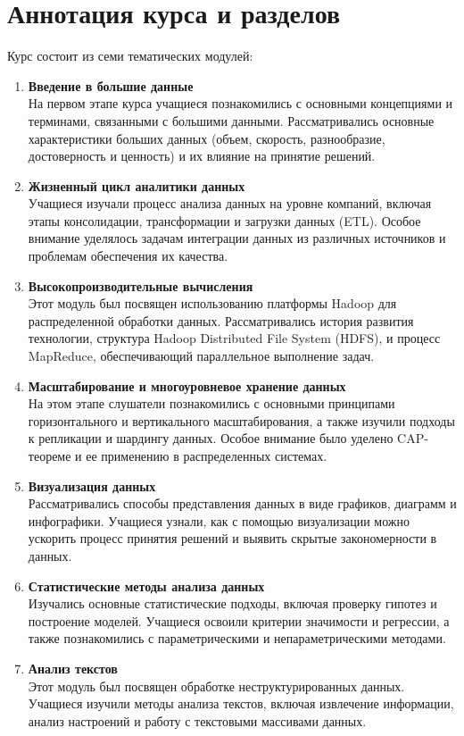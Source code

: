 \documentclass[a4paper, final]{article}
\begin{document}
\newpage
\section{Аннотация курса и разделов}
Курс состоит из семи тематических модулей:
\begin{enumerate}
  \item \textbf{Введение в большие данные} \\
На первом этапе курса учащиеся познакомились с основными концепциями и терминами, связанными с большими данными. Рассматривались основные характеристики больших данных (объем, скорость, разнообразие, достоверность и ценность) и их влияние на принятие решений.

  \item \textbf{Жизненный цикл аналитики данных} \\
Учащиеся изучали процесс анализа данных на уровне компаний, включая этапы консолидации, трансформации и загрузки данных (ETL). Особое внимание уделялось задачам интеграции данных из различных источников и проблемам обеспечения их качества.

  \item \textbf{Высокопроизводительные вычисления}\\
Этот модуль был посвящен использованию платформы Hadoop для распределенной обработки данных. Рассматривались история развития технологии, структура Hadoop Distributed File System (HDFS), и процесс MapReduce, обеспечивающий параллельное выполнение задач.

  \item \textbf{Масштабирование и многоуровневое хранение данных}\\
На этом этапе слушатели познакомились с основными принципами горизонтального и вертикального масштабирования, а также изучили подходы к репликации и шардингу данных. Особое внимание было уделено CAP-теореме и ее применению в распределенных системах.

  \item \textbf{Визуализация данных}\\
Рассматривались способы представления данных в виде графиков, диаграмм и инфографики. Учащиеся узнали, как с помощью визуализации можно ускорить процесс принятия решений и выявить скрытые закономерности в данных.

  \item \textbf{Статистические методы анализа данных}\\
Изучались основные статистические подходы, включая проверку гипотез и построение моделей. Учащиеся освоили критерии значимости и регрессии, а также познакомились с параметрическими и непараметрическими методами.

  \item \textbf{Анализ текстов}\\
Этот модуль был посвящен обработке неструктурированных данных. Учащиеся изучили методы анализа текстов, включая извлечение информации, анализ настроений и работу с текстовыми массивами данных.
\end{enumerate}
\end{document}
